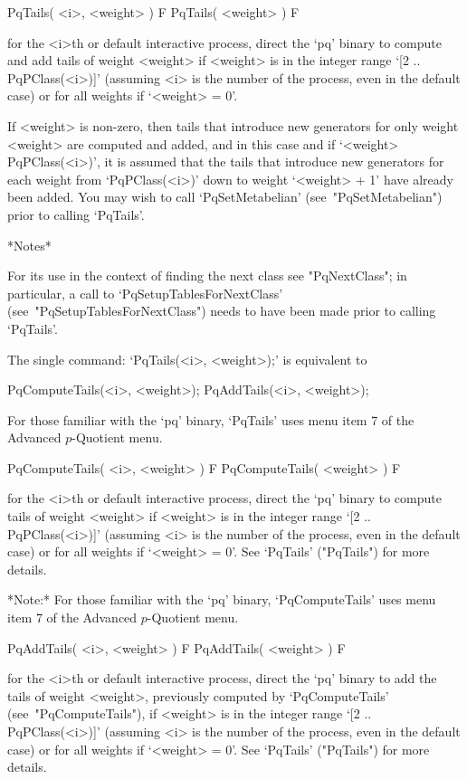 \>PqTails( <i>, <weight> ) F
\>PqTails( <weight> ) F

for the <i>th or default interactive {\ANUPQ} process,  direct  the  `pq'
binary to compute and add tails of weight <weight> if <weight> is in  the
integer range `[2 .. PqPClass(<i>)]' (assuming <i> is the number  of  the
process, even in the default case) or for all weights if `<weight> = 0'.

If <weight> is non-zero, then tails that  introduce  new  generators  for
only weight <weight> are computed and added, and  in  this  case  and  if
`<weight> \< PqPClass(<i>)', it is assumed that the tails that  introduce
new generators for  each  weight  from  `PqPClass(<i>)'  down  to  weight
`<weight>  +  1'  have  already  been  added.  You  may  wish   to   call
`PqSetMetabelian' (see~"PqSetMetabelian") prior to calling `PqTails'.

*Notes*

For its use in the context of finding the next class  see  "PqNextClass";
in     particular,     a     call     to      `PqSetupTablesForNextClass'
(see~"PqSetupTablesForNextClass")  needs  to  have  been  made  prior  to
calling `PqTails'.

The single command: `PqTails(<i>, <weight>);' is equivalent to

PqComputeTails(<i>, <weight>);
PqAddTails(<i>, <weight>);

For those familiar with the `pq' binary, `PqTails' uses menu  item  7  of
the Advanced $p$-Quotient menu.

\>PqComputeTails( <i>, <weight> ) F
\>PqComputeTails( <weight> ) F

for the <i>th or default interactive {\ANUPQ} process,  direct  the  `pq'
binary to compute tails of weight <weight> if <weight> is in the  integer
range `[2 .. PqPClass(<i>)]' (assuming <i> is the number of the  process,
even in the default case) or for all  weights  if  `<weight>  =  0'.  See
`PqTails' ("PqTails") for more details.

*Note:*
For those familiar with the `pq' binary, `PqComputeTails' uses menu  item
7 of the Advanced $p$-Quotient menu.

\>PqAddTails( <i>, <weight> ) F
\>PqAddTails( <weight> ) F

for the <i>th or default interactive {\ANUPQ} process,  direct  the  `pq'
binary to add the  tails  of  weight  <weight>,  previously  computed  by
`PqComputeTails' (see~"PqComputeTails"), if <weight> is  in  the  integer
range `[2 .. PqPClass(<i>)]' (assuming <i> is the number of the  process,
even in the default case) or for all  weights  if  `<weight>  =  0'.  See
`PqTails' ("PqTails") for more details.

